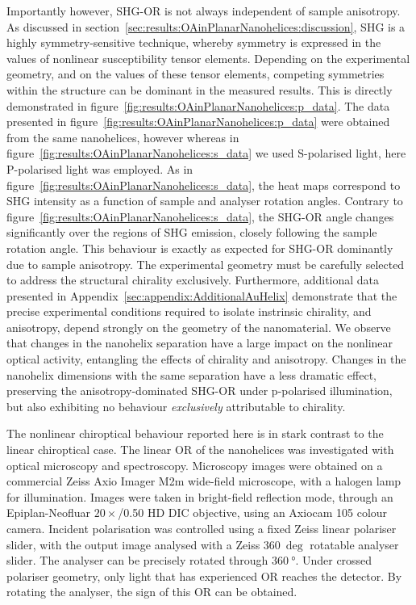 Importantly however, SHG-OR is not always independent of sample anisotropy. As discussed in section~\ref{sec:results:OAinPlanarNanohelices:discussion}, SHG is a highly symmetry-sensitive technique, whereby symmetry is expressed in the values of nonlinear susceptibility tensor elements. Depending on the experimental geometry, and on the values of these tensor elements, competing symmetries within the structure can be dominant in the measured results. This is directly demonstrated in figure~\ref{fig:results:OAinPlanarNanohelices:p_data}. 
The data presented in figure~\ref{fig:results:OAinPlanarNanohelices:p_data} were obtained from the same nanohelices, however whereas in figure~\ref{fig:results:OAinPlanarNanohelices:s_data} we used S-polarised light, here P-polarised light was employed. As in figure~\ref{fig:results:OAinPlanarNanohelices:s_data}, the heat maps correspond to SHG intensity as a function of sample and analyser rotation angles. Contrary to figure~\ref{fig:results:OAinPlanarNanohelices:s_data}, the SHG-OR angle changes significantly over the regions of SHG emission, closely following the sample rotation angle. This behaviour is exactly as expected for SHG-OR dominantly due to sample anisotropy. The experimental geometry must be carefully selected to address the structural chirality exclusively. 
Furthermore, additional data presented in Appendix~\ref{sec:appendix:AdditionalAuHelix} demonstrate that the precise experimental conditions required to isolate instrinsic chirality, and anisotropy, depend strongly on the geometry of the nanomaterial. We observe that changes in the nanohelix separation have a large impact on the nonlinear optical activity, entangling the effects of chirality and anisotropy. Changes in the nanohelix dimensions with the same separation have a less dramatic effect, preserving the anisotropy-dominated SHG-OR under p-polarised illumination, but also exhibiting no behaviour \textit{exclusively} attributable to chirality.

The nonlinear chiroptical behaviour reported here is in stark contrast to the linear chiroptical case. The linear OR of the nanohelices was investigated with optical microscopy and spectroscopy. 
Microscopy images were obtained on a commercial Zeiss Axio Imager M2m wide-field microscope, with a halogen lamp for illumination. Images were taken in bright-field reflection mode, through an Epiplan-Neofluar $20\times$/0.50 HD DIC objective, using an Axiocam 105 colour camera. Incident polarisation was controlled using a fixed Zeiss linear polariser slider, with the output image analysed with a Zeiss $\SI{360}{\deg}$ rotatable analyser slider. 
The analyser can be precisely rotated through $\SI{360}{\degree}$. Under crossed polariser geometry, only light that has experienced OR reaches the detector. By rotating the analyser, the sign of this OR can be obtained. 


